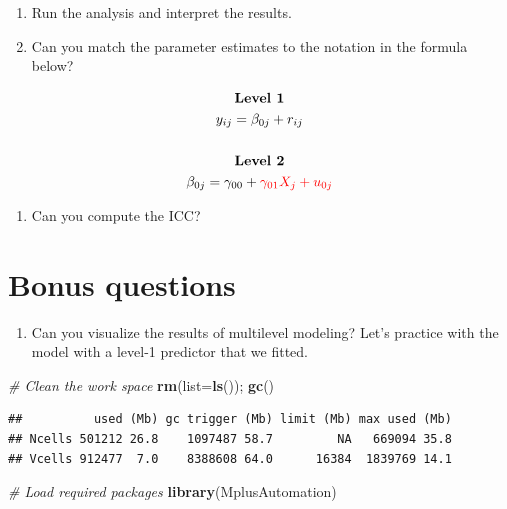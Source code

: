 \documentclass[
]{book}
\newenvironment{Shaded}{\begin{snugshade}}{\end{snugshade}}
\newcommand{\AttributeTok}[1]{\textcolor[rgb]{0.13,0.29,0.53}{#1}}
\newcommand{\CommentTok}[1]{\textcolor[rgb]{0.56,0.35,0.01}{\textit{#1}}}
\newcommand{\FunctionTok}[1]{\textcolor[rgb]{0.13,0.29,0.53}{\textbf{#1}}}
\newcommand{\NormalTok}[1]{#1}
\providecommand{\tightlist}{%
  \setlength{\itemsep}{0pt}\setlength{\parskip}{0pt}}
\begin{document}
\begin{enumerate}
\def\labelenumi{\arabic{enumi}.}
\setcounter{enumi}{1}
\item
  Run the analysis and interpret the results.
\item
  Can you match the parameter estimates to the notation in the formula below?
\end{enumerate}

\[
\begin{gathered}
\textbf{Level 1} \\
y_{ij}=\beta_{0j} + r_{ij} \\ \\
\textbf{Level 2} \\
\beta_{0j}=\gamma_{00} + \color{red}{\gamma_{01}X_{j}} + u_{0j}
\end{gathered}
\]

\begin{enumerate}
\def\labelenumi{\arabic{enumi}.}
\setcounter{enumi}{3}
\tightlist
\item
  Can you compute the ICC?
\end{enumerate}

\section{Bonus questions}\label{bonus-questions-3}

\begin{enumerate}
\def\labelenumi{\arabic{enumi}.}
\tightlist
\item
  Can you visualize the results of multilevel modeling? Let's practice with the model with a level-1 predictor that we fitted.
\end{enumerate}

\begin{Shaded}
\begin{Highlighting}[]
\CommentTok{\# Clean the work space}
\FunctionTok{rm}\NormalTok{(}\AttributeTok{list=}\FunctionTok{ls}\NormalTok{()); }\FunctionTok{gc}\NormalTok{()}
\end{Highlighting}
\end{Shaded}

\begin{verbatim}
##          used (Mb) gc trigger (Mb) limit (Mb) max used (Mb)
## Ncells 501212 26.8    1097487 58.7         NA   669094 35.8
## Vcells 912477  7.0    8388608 64.0      16384  1839769 14.1
\end{verbatim}

\begin{Shaded}
\begin{Highlighting}[]
\CommentTok{\# Load required packages}
\FunctionTok{library}\NormalTok{(MplusAutomation)}
\end{Highlighting}
\end{Shaded}
\end{document}
